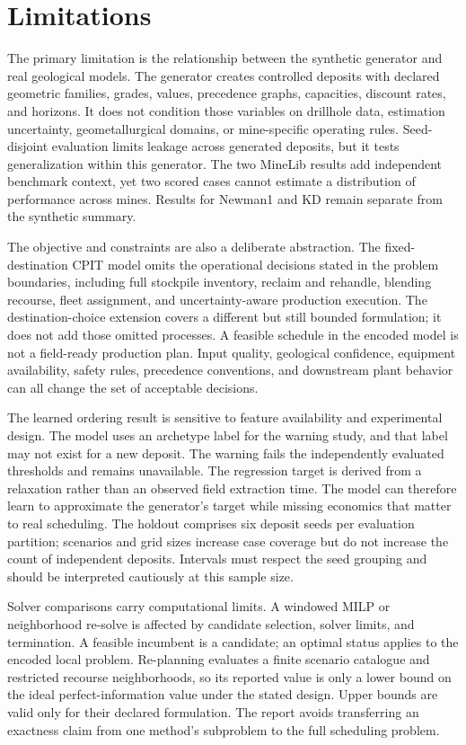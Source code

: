\documentclass[11pt]{article}
\begin{document}
\section{Limitations}
\label{sec:limitations}
The primary limitation is the relationship between the synthetic generator and real geological models. The generator creates controlled deposits with declared geometric families, grades, values, precedence graphs, capacities, discount rates, and horizons. It does not condition those variables on drillhole data, estimation uncertainty, geometallurgical domains, or mine-specific operating rules. Seed-disjoint evaluation limits leakage across generated deposits, but it tests generalization within this generator. The two MineLib results add independent benchmark context, yet two scored cases cannot estimate a distribution of performance across mines. Results for Newman1 and KD remain separate from the synthetic summary.

The objective and constraints are also a deliberate abstraction. The fixed-destination CPIT model omits the operational decisions stated in the problem boundaries, including full stockpile inventory, reclaim and rehandle, blending recourse, fleet assignment, and uncertainty-aware production execution. The destination-choice extension covers a different but still bounded formulation; it does not add those omitted processes. A feasible schedule in the encoded model is not a field-ready production plan. Input quality, geological confidence, equipment availability, safety rules, precedence conventions, and downstream plant behavior can all change the set of acceptable decisions.

The learned ordering result is sensitive to feature availability and experimental design. The model uses an archetype label for the warning study, and that label may not exist for a new deposit. The warning fails the independently evaluated thresholds and remains unavailable. The regression target is derived from a relaxation rather than an observed field extraction time. The model can therefore learn to approximate the generator's target while missing economics that matter to real scheduling. The holdout comprises six deposit seeds per evaluation partition; scenarios and grid sizes increase case coverage but do not increase the count of independent deposits. Intervals must respect the seed grouping and should be interpreted cautiously at this sample size.

Solver comparisons carry computational limits. A windowed MILP or neighborhood re-solve is affected by candidate selection, solver limits, and termination. A feasible incumbent is a candidate; an optimal status applies to the encoded local problem. Re-planning evaluates a finite scenario catalogue and restricted recourse neighborhoods, so its reported value is only a lower bound on the ideal perfect-information value under the stated design. Upper bounds are valid only for their declared formulation. The report avoids transferring an exactness claim from one method's subproblem to the full scheduling problem.
\end{document}
